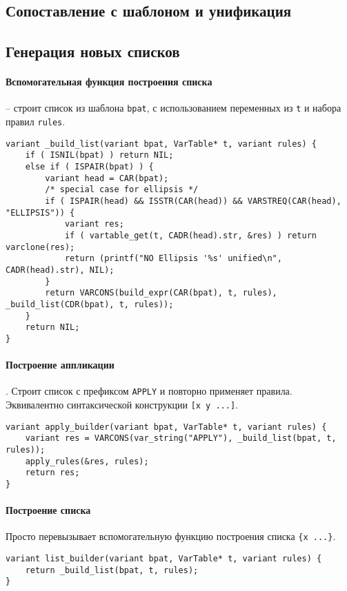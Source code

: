 \documentclass[10pt]{report}
\begin{document}
\subsection{Сопоставление с шаблоном и унификация}
\subsection{Генерация новых списков}
\paragraph{Вспомогательная функция построения списка} -- строит список из шаблона \texttt{bpat}, с использованием переменных из \texttt{t} и набора правил {\tt rules}.
\begin{lstlisting}[firstnumber=10]
variant _build_list(variant bpat, VarTable* t, variant rules) {
	if ( ISNIL(bpat) ) return NIL;
	else if ( ISPAIR(bpat) ) {
		variant head = CAR(bpat);
		/* special case for ellipsis */
		if ( ISPAIR(head) && ISSTR(CAR(head)) && VARSTREQ(CAR(head), "ELLIPSIS")) {
			variant res;
			if ( vartable_get(t, CADR(head).str, &res) ) return varclone(res);
			return (printf("NO Ellipsis '%s' unified\n", CADR(head).str), NIL); 
		} 
		return VARCONS(build_expr(CAR(bpat), t, rules), _build_list(CDR(bpat), t, rules));
	}
	return NIL;
}
\end{lstlisting}
\paragraph{Построение аппликации}. Строит список с префиксом \texttt{APPLY} и повторно применяет правила. Эквивалентно синтаксической конструкции \verb|[x y ...]|.
\begin{lstlisting}[firstnumber=25]
variant apply_builder(variant bpat, VarTable* t, variant rules) {
	variant res = VARCONS(var_string("APPLY"), _build_list(bpat, t, rules));
	apply_rules(&res, rules);
	return res;
}
\end{lstlisting}
\paragraph{Построение списка} Просто перевызывает вспомогательную функцию построения списка \verb${x ...}$.
\begin{lstlisting}[firstnumber=31]
variant list_builder(variant bpat, VarTable* t, variant rules) {
	return _build_list(bpat, t, rules);	
}
\end{lstlisting}
\end{document}
